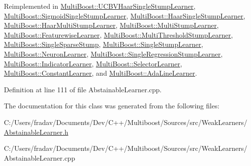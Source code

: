Reimplemented in \hyperlink{classMultiBoost_1_1UCBVHaarSingleStumpLearner_ac57c9a360303b9593a0367256e65fed8}{Multi\-Boost\-::\-U\-C\-B\-V\-Haar\-Single\-Stump\-Learner}, \hyperlink{classMultiBoost_1_1SigmoidSingleStumpLearner_adb4ca5ac6be19aa7244d04ac7b24d79d}{Multi\-Boost\-::\-Sigmoid\-Single\-Stump\-Learner}, \hyperlink{classMultiBoost_1_1HaarSingleStumpLearner_a918541140437c8d7f7575c76b37ad652}{Multi\-Boost\-::\-Haar\-Single\-Stump\-Learner}, \hyperlink{classMultiBoost_1_1HaarMultiStumpLearner_a23e1bf8c0ff7ccb455ca14d5ddae247f}{Multi\-Boost\-::\-Haar\-Multi\-Stump\-Learner}, \hyperlink{classMultiBoost_1_1MultiStumpLearner_a261fe1a54a6032f23759c4287afe39e3}{Multi\-Boost\-::\-Multi\-Stump\-Learner}, \hyperlink{classMultiBoost_1_1FeaturewiseLearner_a31c71079d30d1d7c81624a6e789a3a24}{Multi\-Boost\-::\-Featurewise\-Learner}, \hyperlink{classMultiBoost_1_1MultiThresholdStumpLearner_a093c9a16e80ab2fe90470c43f24b0bfb}{Multi\-Boost\-::\-Multi\-Threshold\-Stump\-Learner}, \hyperlink{classMultiBoost_1_1SingleSparseStump_a0c815aa6bd664984f0baa6d94cde7cff}{Multi\-Boost\-::\-Single\-Sparse\-Stump}, \hyperlink{classMultiBoost_1_1SingleStumpLearner_a81fc70ee14b9714289f998977a8e0e1b}{Multi\-Boost\-::\-Single\-Stump\-Learner}, \hyperlink{classMultiBoost_1_1NeuronLearner_a123916b011566aad19552783032a3e30}{Multi\-Boost\-::\-Neuron\-Learner}, \hyperlink{classMultiBoost_1_1SingleRegressionStumpLearner_af449d15e3389ec33d37613e9684148ba}{Multi\-Boost\-::\-Single\-Regression\-Stump\-Learner}, \hyperlink{classMultiBoost_1_1IndicatorLearner_a47fb712bf8e44ebd7a7af759423b8fcc}{Multi\-Boost\-::\-Indicator\-Learner}, \hyperlink{classMultiBoost_1_1SelectorLearner_aac96f1fddd89c6382240fc7d0ddae478}{Multi\-Boost\-::\-Selector\-Learner}, \hyperlink{classMultiBoost_1_1ConstantLearner_a019e0eebd46b00a15b37bcb1d101f33d}{Multi\-Boost\-::\-Constant\-Learner}, and \hyperlink{classMultiBoost_1_1AdaLineLearner_a4b96e7dce0bb66b4dbe48caef6582699}{Multi\-Boost\-::\-Ada\-Line\-Learner}.



Definition at line 111 of file Abstainable\-Learner.\-cpp.



The documentation for this class was generated from the following files\-:\begin{DoxyCompactItemize}
\item 
C\-:/\-Users/fradav/\-Documents/\-Dev/\-C++/\-Multiboost/\-Sources/src/\-Weak\-Learners/\hyperlink{AbstainableLearner_8h}{Abstainable\-Learner.\-h}\item 
C\-:/\-Users/fradav/\-Documents/\-Dev/\-C++/\-Multiboost/\-Sources/src/\-Weak\-Learners/Abstainable\-Learner.\-cpp\end{DoxyCompactItemize}
